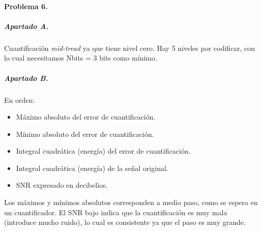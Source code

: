\finishpage


\startpage
\paragraph{Problema 6.}

\subparagraph{Apartado A.}

Cuantificación \emph{mid-tread} ya que tiene nivel cero. Hay 5 niveles por
codificar, con lo cual necesitamos \textsf{Nbits} = 3 bits como mínimo.

\subparagraph{Apartado B.}

En orden:

\begin{itemize}
\item Máximo absoluto del error de cuantificación.
\item Mínimo absoluto del error de cuantificación.
\item Integral cuadrática (energía) del error de cuantificación.
\item Integral cuadrática (energía) de la señal original.
\item SNR expresado en decibelios.
\end{itemize}

Los máximos y mínimos absolutos corresponden a medio paso, como se espera
en un cuantificador. El SNR bajo indica que la cuantificación es muy mala
(introduce mucho ruido), lo cual es consistente ya que el paso es muy grande.

\finishpage

